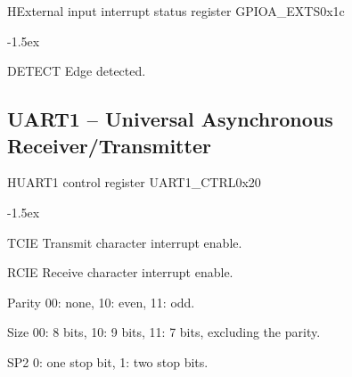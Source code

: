 \documentclass[12pt]{article}
\begin{document}
\begin{register}{H}{External input interrupt status register GPIOA\_EXTS}{0x1c}%
\label{exts}%
%
\regnewline%
\end{register}
\begin{regdesc}[0.7\textwidth]\begin{reglist}[000000]
\itemsep-1.5ex
\item[DETECT] Edge detected.
\end{reglist}\end{regdesc}

\subsection{UART1 -- Universal Asynchronous Receiver/Transmitter}

\begin{register}{H}{UART1 control register UART1\_CTRL}{0x20}
\label{uart1ctrl}
%
%
%
%
%
%
\regnewline%
\end{register}
\begin{regdesc}[0.7\textwidth]\begin{reglist}[00000]
\itemsep-1.5ex
\item[TCIE] Transmit character interrupt enable.
\item[RCIE] Receive character interrupt enable.
\item[Parity] 00: none, 10: even, 11: odd.
\item[Size] 00: 8 bits, 10: 9 bits, 11: 7 bits, excluding the parity.
\item[SP2] 0: one stop bit, 1: two stop bits.
\end{reglist}\end{regdesc}
\end{document}
